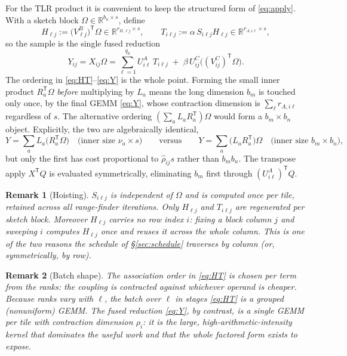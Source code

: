 \documentclass[11pt]{article}
\newtheorem{remark}{Remark}
\newcommand{\R}{\mathbb{R}}
\newcommand{\T}{\mathsf{T}}
\begin{document}
For the TLR product it is convenient to keep the structured form of
\eqref{eq:apply}. With a sketch block $\Omega\in\R^{b_n\times s}$, define
\begin{equation}
\label{eq:HT}
H_{\ell j}:=\bigl(V^B_{\ell j}\bigr)^{\T}\Omega\in\R^{r_{B,\ell j}\times s},
\qquad
T_{i\ell j}:=\alpha\,S_{i\ell j}H_{\ell j}\in\R^{r_{A,i\ell}\times s},
\end{equation}
so the sample is the single fused reduction
\begin{equation}
\label{eq:Y}
Y_{ij}=X_{ij}\Omega=\sum_{\ell=1}^{q_k}U^A_{i\ell}\,T_{i\ell j}
\;+\;\beta\,U^C_{ij}\bigl((V^C_{ij})^{\T}\Omega\bigr).
\end{equation}
The ordering in \eqref{eq:HT}--\eqref{eq:Y} is the whole point. Forming the small
inner product $R_a^{\T}\Omega$ \emph{before} multiplying by $L_a$ means the long
dimension $b_m$ is touched only once, by the final GEMM \eqref{eq:Y}, whose
contraction dimension is $\sum_\ell r_{A,i\ell}$ regardless of $s$. The
alternative ordering $(\sum_aL_aR_a^{\T})\Omega$ would form a
$b_m\times b_n$ object. Explicitly, the two are algebraically identical,
\[
Y=\sum_a L_a\bigl(R_a^{\T}\Omega\bigr)
\quad\text{(inner size }\nu_a\times s)\qquad\text{versus}\qquad
Y=\sum_a\bigl(L_aR_a^{\T}\bigr)\Omega
\quad\text{(inner size }b_m\times b_n),
\]
but only the first has cost proportional to $\hat\rho_{ij}s$ rather than
$b_mb_n$. The transpose apply $X^{\T}Q$ is evaluated symmetrically, eliminating
$b_m$ first through $(U^A_{i\ell})^{\T}Q$.

\begin{remark}[Hoisting]
\label{rem:hoist}
$S_{i\ell j}$ is independent of $\Omega$ and is computed once per tile, retained
across all range-finder iterations. Only $H_{\ell j}$ and $T_{i\ell j}$ are
regenerated per sketch block. Moreover $H_{\ell j}$ carries no row index $i$:
fixing a block column $j$ and sweeping $i$ computes $H_{\ell j}$ once and reuses
it across the whole column. This is one of the two reasons the schedule of
\S\ref{sec:schedule} traverses by column (or, symmetrically, by row).
\end{remark}

\begin{remark}[Batch shape]
\label{rem:batch}
The association order in \eqref{eq:HT} is chosen per term from the ranks: the
coupling is contracted against whichever operand is cheaper. Because ranks vary
with $\ell$, the batch over $\ell$ in stages \eqref{eq:HT} is a grouped
(nonuniform) GEMM. The fused reduction \eqref{eq:Y}, by contrast, is a single
GEMM per tile with contraction dimension $\rho_i$: it is the large,
high-arithmetic-intensity kernel that dominates the useful work and that the
whole factored form exists to expose.
\end{remark}
\end{document}
